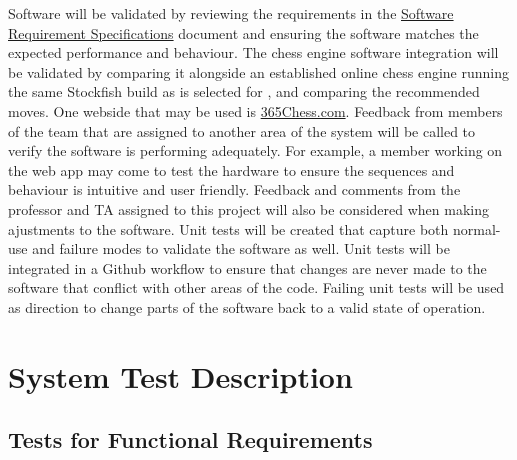 \documentclass[12pt, titlepage]{article}
\begin{document}
Software will be validated by reviewing the requirements in the \href{file:../SRS/SRS.pdf}{Software Requirement Specifications} document and ensuring the software matches the expected performance and behaviour. The chess engine software integration will be validated by comparing it alongside an established online chess engine running the same Stockfish build as is selected for \progname{}, and comparing the recommended moves. One webside that may be used is \href{https://www.365chess.com/analysis_board.php}{365Chess.com}.
\newline
\newline
Feedback from members of the team that are assigned to another area of the system will be called to verify the software is performing adequately. For example, a member working on the web app may come to test the hardware to ensure the sequences and behaviour is intuitive and user friendly. Feedback and comments from the professor and TA assigned to this project will also be considered when making ajustments to the software.
\newline
\newline
Unit tests will be created that capture both normal-use and failure modes to validate the software as well. Unit tests will be integrated in a Github workflow to ensure that changes are never made to the software that conflict with other areas of the code. Failing unit tests will be used as direction to change parts of the software back to a valid state of operation.




\section{System Test Description} \label{SystemTests}
	
\subsection{Tests for Functional Requirements}

\end{document}
